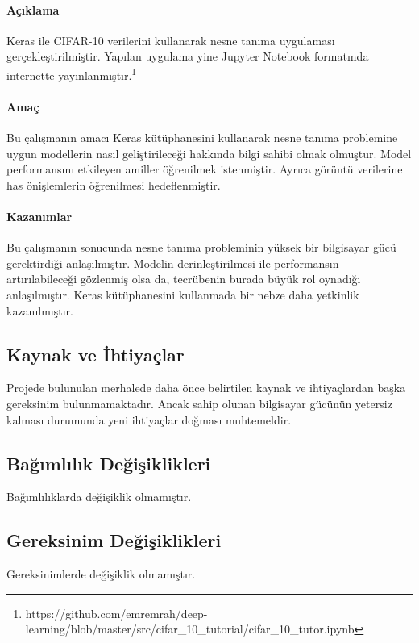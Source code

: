 \documentclass[12pt,a4paper]{article}
\begin{document}
    \paragraph{Açıklama}
    Keras ile CIFAR-10 verilerini kullanarak nesne tanıma uygulaması gerçekleştirilmiştir.
    Yapılan uygulama yine Jupyter Notebook formatında internette yayınlanmıştır.\footnote{https://github.com/emremrah/deep-learning/blob/master/src/cifar\_10\_tutorial/cifar\_10\_tutor.ipynb}

    \paragraph{Amaç}
    Bu çalışmanın amacı Keras kütüphanesini kullanarak nesne tanıma problemine uygun modellerin nasıl geliştirileceği hakkında bilgi sahibi olmak olmuştur.
    Model performansını etkileyen amiller öğrenilmek istenmiştir. Ayrıca görüntü verilerine has önişlemlerin öğrenilmesi hedeflenmiştir.

    \paragraph{Kazanımlar}
    Bu çalışmanın sonucunda nesne tanıma probleminin yüksek bir bilgisayar gücü gerektirdiği anlaşılmıştır.
    Modelin derinleştirilmesi ile performansın artırılabileceği gözlenmiş olsa da, tecrübenin burada büyük rol oynadığı anlaşılmıştır.
    Keras kütüphanesini kullanmada bir nebze daha yetkinlik kazanılmıştır.

    \subsection{Kaynak ve İhtiyaçlar}
    Projede bulunulan merhalede daha önce belirtilen kaynak ve ihtiyaçlardan başka gereksinim bulunmamaktadır. Ancak sahip olunan bilgisayar gücünün yetersiz
    kalması durumunda yeni ihtiyaçlar doğması muhtemeldir.

    \subsection{Bağımlılık Değişiklikleri}
    Bağımlılıklarda değişiklik olmamıştır.

    \subsection{Gereksinim Değişiklikleri}
    Gereksinimlerde değişiklik olmamıştır.
\end{document}
